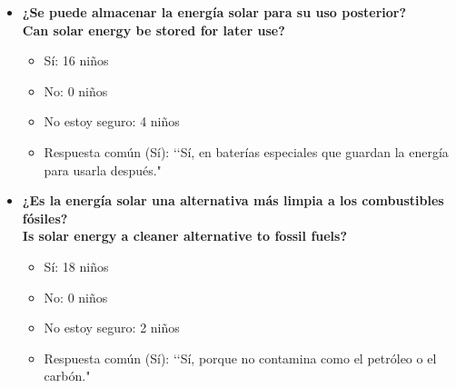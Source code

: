 \documentclass[12pt]{article}
\begin{document}
\begin{itemize}
      \item \textbf{¿Se puede almacenar la energía solar para su uso posterior?}\\
            \textbf{Can solar energy be stored for later use?}
            \begin{itemize}
                  \item Sí: 16 niños
                  \item No: 0 niños
                  \item No estoy seguro: 4 niños
                  \item Respuesta común (Sí): \lq\lq Sí, en baterías especiales que guardan la energía para usarla después."
            \end{itemize}
            \begin{minipage}{\linewidth}
                  \centering
                  \begin{minipage}{0.5\linewidth}
                  \end{minipage}%
            \end{minipage}

      \item \textbf{¿Es la energía solar una alternativa más limpia a los combustibles fósiles?}\\
            \textbf{Is solar energy a cleaner alternative to fossil fuels?}
            \begin{itemize}
                  \item Sí: 18 niños
                  \item No: 0 niños
                  \item No estoy seguro: 2 niños
                  \item Respuesta común (Sí): \lq\lq Sí, porque no contamina como el petróleo o el carbón."
            \end{itemize}
            \begin{minipage}{\linewidth}
                  \centering
                  \begin{minipage}{0.5\linewidth}
                  \end{minipage}%
            \end{minipage}


\end{itemize}
\end{document}
